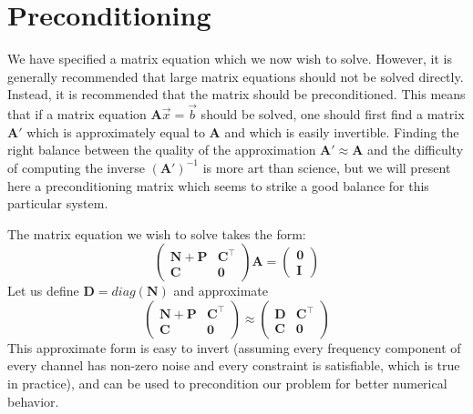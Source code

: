 \section{Preconditioning}

We have specified a matrix equation which we now wish to solve.  However, it is generally recommended that large matrix equations should not be solved directly.  Instead, it is recommended that the matrix should be preconditioned.  This means that if a matrix equation $\mathbf{A}\vec{x} = \vec{b}$ should be solved, one should first find a matrix $\mathbf{A}'$ which is approximately equal to $\mathbf{A}$ and which is easily invertible.  Finding the right balance between the quality of the approximation $\mathbf{A}' \approx \mathbf{A}$ and the difficulty of computing the inverse $\left(\mathbf{A}'\right)^{-1}$ is more art than science, but we will present here a preconditioning matrix which seems to strike a good balance for this particular system.

The matrix equation we wish to solve takes the form:
\begin{equation}\begin{pmatrix}
\mathbf{N}+\mathbf{P} & \mathbf{C}^\top\\
\mathbf{C} & \mathbf{0}
\end{pmatrix}
\mathbf{A} = 
\begin{pmatrix}
\mathbf{0} \\ \mathbf{I}
\end{pmatrix}\end{equation}
Let us define $\mathbf{D} = diag(\mathbf{N})$ and approximate
\begin{equation}\begin{pmatrix}
\mathbf{N}+\mathbf{P} & \mathbf{C}^\top\\
\mathbf{C} & \mathbf{0}
\end{pmatrix}
\approx
\begin{pmatrix}
\mathbf{D} & \mathbf{C}^\top \\
\mathbf{C} & \mathbf{0}
\end{pmatrix}\end{equation}
This approximate form is easy to invert (assuming every frequency component of every channel has non-zero noise and every constraint is satisfiable, which is true in practice), and can be used to precondition our problem for better numerical behavior.

